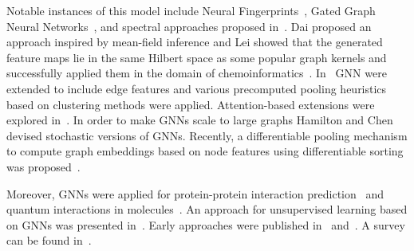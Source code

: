 {Notable instances of this model include Neural
Fingerprints~\cite{Duv+2015}, Gated Graph Neural
Networks~\cite{Li+2016}, and spectral approaches proposed
in~\cite{Bru+2014,Def+2015,kipf2017semi}. Dai \etal\cite{dai2016discriminative}
proposed an approach inspired by mean-field inference
and Lei \etal\cite{Lei+2017} showed that the generated
feature maps lie in the same Hilbert space as some popular graph
kernels and successfully applied them in the domain of
chemoinformatics~\cite{Jin+2018}. In~\cite{simonovsky2017dynamic} GNN were extended to include edge features and various precomputed pooling heuristics based on clustering methods were applied. Attention-based extensions were explored in~\cite{Vel+2018}. In order to make GNNs scale to large graphs Hamilton \etal\cite{hamilton2017inductive} and Chen \etal\cite{Che+2018} devised stochastic versions of GNNs. Recently, a differentiable pooling mechanism to compute graph embeddings based on node features using differentiable sorting was proposed~\cite{zhang2018end}.

Moreover, GNNs were applied for protein-protein
interaction prediction~\cite{Fou+2017} and quantum interactions in
molecules~\cite{Sch+2017}. An approach for unsupervised learning based
on GNNs was presented in~\cite{Gar+2017}. Early
approaches were published in~\cite{Mer+2005} and~\cite{Sca+2009,
Sca+2009a}. A survey can be found in~\cite{Ham+2017a}.

}





